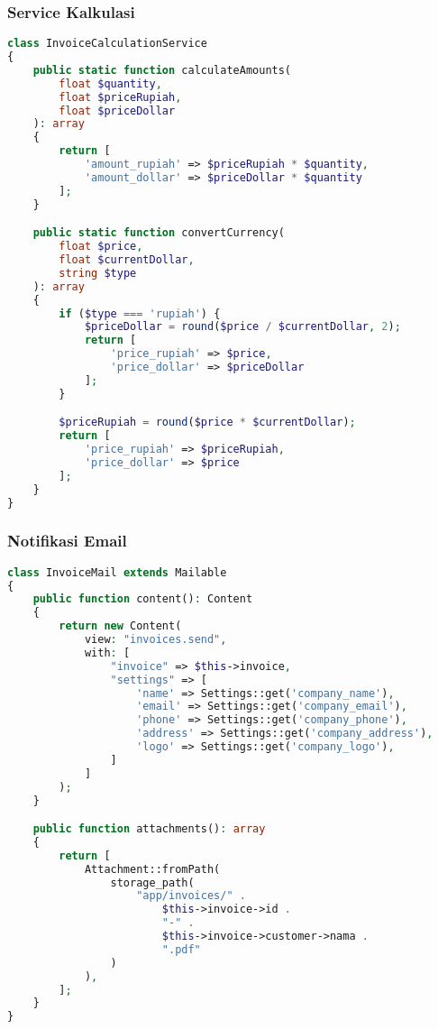 \documentclass[a4paper]{report}
\begin{document}
\subsubsection{Service Kalkulasi}
\begin{lstlisting}[language=PHP]
class InvoiceCalculationService 
{
    public static function calculateAmounts(
        float $quantity, 
        float $priceRupiah, 
        float $priceDollar
    ): array 
    {
        return [
            'amount_rupiah' => $priceRupiah * $quantity,
            'amount_dollar' => $priceDollar * $quantity
        ];
    }

    public static function convertCurrency(
        float $price, 
        float $currentDollar, 
        string $type
    ): array 
    {
        if ($type === 'rupiah') {
            $priceDollar = round($price / $currentDollar, 2);
            return [
                'price_rupiah' => $price,
                'price_dollar' => $priceDollar
            ];
        }

        $priceRupiah = round($price * $currentDollar);
        return [
            'price_rupiah' => $priceRupiah, 
            'price_dollar' => $price
        ];
    }
}
\end{lstlisting}

\subsubsection{Notifikasi Email}
\begin{lstlisting}[language=PHP]
class InvoiceMail extends Mailable
{
    public function content(): Content
    {
        return new Content(
            view: "invoices.send",
            with: [
                "invoice" => $this->invoice,
                "settings" => [
                    'name' => Settings::get('company_name'),
                    'email' => Settings::get('company_email'),
                    'phone' => Settings::get('company_phone'),
                    'address' => Settings::get('company_address'),
                    'logo' => Settings::get('company_logo'),
                ]
            ]
        );
    }

    public function attachments(): array
    {
        return [
            Attachment::fromPath(
                storage_path(
                    "app/invoices/" .
                        $this->invoice->id .
                        "-" .
                        $this->invoice->customer->nama .
                        ".pdf"
                )
            ),
        ];
    }
}
\end{lstlisting}
\end{document}
